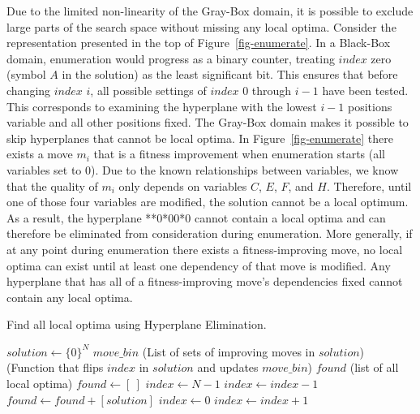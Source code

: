 \documentclass[runningheads,a4paper]{llncs}
\begin{document}
Due to the limited non-linearity of the Gray-Box domain, it is possible to exclude large
parts of the search space without missing any local optima.
Consider the representation presented in the top of Figure~\ref{fig-enumerate}. In a Black-Box
domain, enumeration would progress as a binary counter, treating $index$ zero (symbol $A$ in the solution) as
the least significant bit. This ensures that before changing $index$ $i$, all possible settings of $index$
0 through $i-1$ have been tested. This corresponds to examining the hyperplane with the lowest $i-1$ positions
variable and all other positions fixed. The Gray-Box domain makes it possible to skip hyperplanes
that cannot be local optima. In Figure~\ref{fig-enumerate} there exists a move $m_i$ that is a fitness improvement
when enumeration starts (all variables set to 0). Due to the known relationships between variables,
we know that the quality of $m_i$ only depends on variables $C$, $E$, $F$, and $H$.
Therefore, until one of those four variables are modified, the solution cannot be a local optimum.
As a result, the hyperplane **0*00*0 cannot contain a local optima and can
therefore be eliminated from consideration during enumeration.
More generally, if at any point during enumeration
there exists a fitness-improving move, no local optima can exist until at least one
dependency of that move is modified. Any hyperplane that has all of a fitness-improving
move's dependencies fixed cannot contain any local optima.

\begin{algorithm}
  \caption{Find all local optima using Hyperplane Elimination.}
  \label{alg-enumerate}
  \begin{algorithmic}[1]
    \Require $solution \leftarrow \{0\}^N$
    \Require $move\_bin$ (List of sets of improving moves in $solution$)
    \Require {} (Function that flips $index$ in $solution$ and updates $move\_bin$)
    \Ensure $found$ (list of all local optima)
    \State $found \leftarrow [~]$
    \State $index \leftarrow N-1$
      \label{alg-enumerate-bincheck}
        \State $index \leftarrow index-1$
      \EndWhile
        \State $found \leftarrow found + [solution]$
        \State $index \leftarrow 0$
      \EndIf
      \label{alg-enumerate-counter}
        \State {}
        \State $index \leftarrow index + 1$
      \EndWhile
        \State {}\label{alg-enumerate-insert}
      \EndIf
    \EndWhile
  \end{algorithmic}
\end{algorithm}
\end{document}
